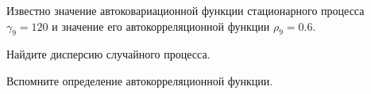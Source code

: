 
\begin{question}
Известно значение автоковариационной функции стационарного процесса \(\gamma_9 = 120\) и значение его автокорреляционной функции \(\rho_9 = 0.6\).

Найдите дисперсию случайного процесса.
\end{question}

\begin{solution}
Вспомните определение автокорреляционной функции.
\end{solution}

